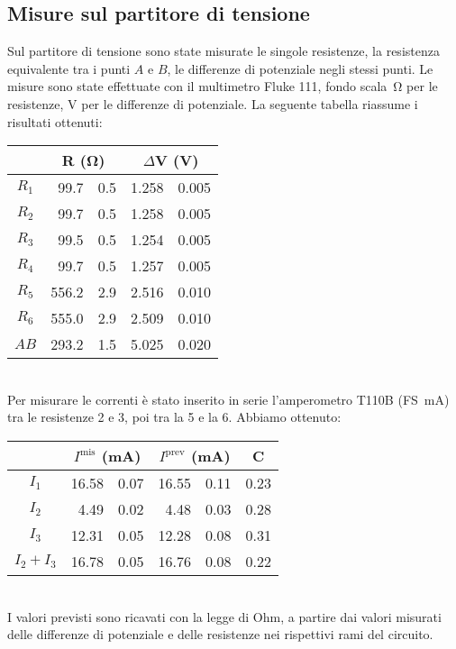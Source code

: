 \documentclass[italian,a4paper]{article}
\begin{document}
\subsection{Misure sul partitore di tensione}
Sul partitore di tensione sono state misurate le singole resistenze, la resistenza equivalente tra i punti $A$ e $B$, le differenze di potenziale negli stessi punti.
Le misure sono state effettuate con il multimetro Fluke 111, fondo scala~\unit[600]{\ohm} per le resistenze, \unit[6]{V} per le differenze di potenziale. La seguente tabella riassume i risultati ottenuti:
\begin{table}[h]
\centering
 \begin{tabular}{c r@{ $\pm$ }l r@{ $\pm$ }l}
 &\multicolumn{2}{c}{R (\unit{\ohm})} &\multicolumn{2}{c}{$\Delta$V (\unit{V})}\\\hline
$R_1$ &99.7 &0.5 &1.258 &0.005\\
$R_2$ &99.7 &0.5 &1.258 &0.005\\
$R_3$ &99.5 &0.5 &1.254 &0.005\\
$R_4$ &99.7 &0.5 &1.257 &0.005\\
$R_5$ &556.2 &2.9 &2.516 &0.010\\
$R_6$ &555.0 &2.9 &2.509 &0.010\\
$AB$ &293.2 &1.5 &5.025 &0.020\\
 \end{tabular}
\end{table}\\
Per misurare le correnti è stato inserito in serie l'amperometro T110B (FS~\unit[20]{mA}) tra le resistenze 2 e 3, poi tra la 5 e la 6. Abbiamo ottenuto:
\begin{table}[h]
\centering
 \begin{tabular}{c r@{ $\pm$ }l r@{ $\pm$ }l c}
 &\multicolumn{2}{c}{$I^{\text{mis}}$ (\unit{mA})} &\multicolumn{2}{c}{$I^{\text{prev}}$ (\unit{mA})} &C\\\hline
$I_1$ &16.58 &0.07 & 16.55 & 0.11 & 0.23\\
$I_2$ &4.49 &0.02 & 4.48 & 0.03 & 0.28\\
$I_3$ &12.31&0.05 & 12.28 & 0.08 & 0.31\\\hline
$I_2+I_3$ &16.78&0.05 & 16.76 & 0.08& 0.22\\
 \end{tabular}
\end{table}\\
I valori previsti sono ricavati con la legge di Ohm, a partire dai valori misurati delle differenze di potenziale e delle resistenze nei rispettivi rami del circuito.
\end{document}

